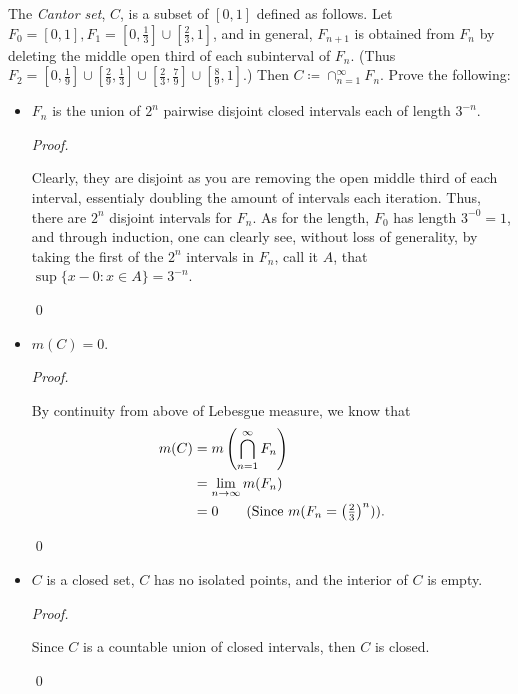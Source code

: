 \documentclass[12pt]{article}
\newenvironment{problem}[2][Problem]{\begin{trivlist}
\item[\hskip \labelsep {\bfseries #1}\hskip \labelsep {\bfseries
#2.}]}{\end{trivlist}}
\newenvironment{sol}
    {\emph{Proof.}
    }
    {
    \qed
    }
\begin{document}
  \begin{problem}{40}
    The \textit{Cantor set}, $C$, is a subset of $[0,1]$ defined as follows. Let $F_0 = [0,1], F_1 = [0,\frac{1}{3}]\cup[\frac{2}{3},1]$, and in general, $F_{n+1}$ is obtained from $F_n$ by deleting the middle open third of each subinterval of $F_n$. (Thus $F_2 = [0,\frac{1}{9}]\cup[\frac{2}{9},\frac{1}{3}]\cup[\frac{2}{3},\frac{7}{9}]\cup[\frac{8}{9},1]$.) Then $C \coloneqq \cap_{n = 1}^{\infty}F_n$. Prove the following:
    \begin{itemize}
      \item[(a)] $F_n$ is the union of $2^n$ pairwise disjoint closed intervals each of length $3^{-n}$.
       
      \begin{sol}
        Clearly, they are disjoint as you are removing the open middle third of each interval, essentialy doubling the amount of intervals each iteration. Thus, there are $2^n$ disjoint intervals for $F_n$. As for the length, $F_0$ has length $3^{-0} = 1$, and through induction, one can clearly see, without loss of generality, by taking the first of the $2^n$ intervals in $F_n$, call it $A$, that $\sup\{x - 0 : x \in A\} = 3^{-n}$.
      \end{sol}
  
      \item[(b)] $m(C) = 0$.
      
      \begin{sol}
        By continuity from above of Lebesgue measure, we know that 
        \begin{align*}
          m(C) &= m\left(\bigcap_{n = 1}^{\infty}F_n\right) \\
          &= \lim_{n \to \infty} m(F_n) \\
          &= 0 \tag*{(Since $m(F_n = \left(\frac{2}{3} \right)^n)$)}.
        \end{align*}
      \end{sol}
  
      \item[(c)] $C$ is a closed set, $C$ has no isolated points, and the interior of $C$ is empty.  
      
      \begin{sol}
        Since $C$ is a countable union of closed intervals, then $C$ is closed.
      \end{sol}
    \end{itemize}
  \end{problem}
\end{document}
